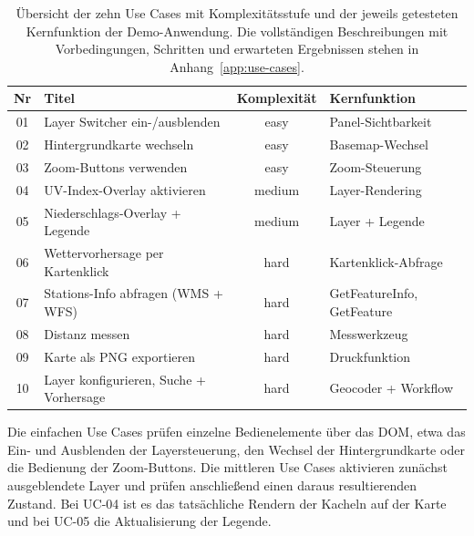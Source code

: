 \begin{table}[htbp]
    \centering
    \renewcommand{\arraystretch}{1.3}
    \begin{tabularx}{\textwidth}{@{}c >{\hsize=1.2\hsize}X c >{\hsize=0.8\hsize}X@{}}
        \toprule
        \textbf{Nr} & \textbf{Titel} & \textbf{Komplexität} & \textbf{Kernfunktion} \\
        \midrule
        01  & Layer Switcher ein-/ausblenden          & easy   & Panel-Sichtbarkeit   \\
        02  & Hintergrundkarte wechseln               & easy   & Basemap-Wechsel      \\
        03  & Zoom-Buttons verwenden                  & easy   & Zoom-Steuerung       \\
        04  & UV-Index-Overlay aktivieren             & medium & Layer-Rendering      \\
        05  & Niederschlags-Overlay + Legende         & medium & Layer + Legende      \\
        06  & Wettervorhersage per Kartenklick        & hard   & Kartenklick-Abfrage  \\
        07  & Stations-Info abfragen (WMS + WFS)      & hard   & GetFeatureInfo, GetFeature \\
        08  & Distanz messen                          & hard   & Messwerkzeug         \\
        09  & Karte als PNG exportieren               & hard   & Druckfunktion        \\
        10 & Layer konfigurieren, Suche + Vorhersage & hard   & Geocoder + Workflow  \\
        \bottomrule
    \end{tabularx}
    \caption[Übersicht der Use Cases mit Komplexität und getesteter Kernfunktion]{Übersicht der zehn Use Cases mit Komplexitätsstufe und der jeweils getesteten Kernfunktion der Demo-Anwendung. Die vollständigen Beschreibungen mit Vorbedingungen, Schritten und erwarteten Ergebnissen stehen in Anhang~\ref{app:use-cases}.}
    \label{tab:use-cases}
\end{table}

Die einfachen Use Cases prüfen einzelne Bedienelemente über das \ac{DOM}, etwa das Ein- und Ausblenden der Layersteuerung, den Wechsel der Hintergrundkarte oder die Bedienung der Zoom-Buttons. Die mittleren Use Cases aktivieren zunächst ausgeblendete Layer und prüfen anschließend einen daraus resultierenden Zustand. Bei UC-04 ist es das tatsächliche Rendern der Kacheln auf der Karte und bei UC-05 die Aktualisierung der Legende.

